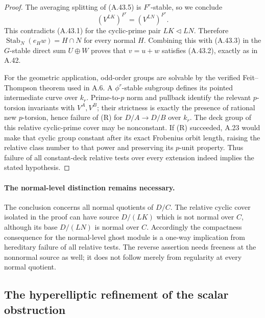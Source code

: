 \documentclass[11pt]{article}
\begin{document}
\begin{proof}
The averaging splitting of (A.43.5) is \(F^r\)-stable,
so we conclude
\[
                         (V^{LK})^{F^r}=(V^{LN})^{F^r}.
\]
This contradicts (A.43.1) for the cyclic-prime pair
\(LK\triangleleft LN\). Therefore
\(\operatorname{Stab}_N(e_Hw)=H\cap N\) for every normal
\(H\). Combining this with (A.43.3) in the
\(G\)-stable direct sum \(U\oplus W\) proves that
\(v=u+w\) satisfies (A.43.2), exactly as in A.42.

For the geometric application, odd-order groups are solvable
by the verified Feit--Thompson theorem used in A.6.
A \(\phi^r\)-stable
subgroup defines its pointed intermediate curve over
\(k_r\). Prime-to-\(p\) norm and pullback identify
the relevant \(p\)-torsion invariants with
\(V^A,V^B\); their strictness is exactly the presence
of rational new \(p\)-torsion, hence failure of (R)
for \(D/A\to D/B\) over \(k_r\). The deck group of
this relative cyclic-prime cover may be nonconstant.
If (R) succeeded, A.23 would make that cyclic group
constant after its exact Frobenius orbit length,
raising the relative class number to that power and
preserving its \(p\)-unit property. Thus failure of
all constant-deck relative tests over every extension
indeed implies the stated hypothesis.
\end{proof}

\paragraph{The normal-level distinction remains necessary.}
The conclusion concerns all normal quotients of \(D/C\).
The relative cyclic cover isolated in the proof can
have source \(D/(LK)\) which is not normal over \(C\),
although its base \(D/(LN)\) is normal over \(C\).
Accordingly the compactness consequence for the
normal-level ghost module is a one-way implication
from hereditary failure of all relative tests.
The reverse assertion needs freeness at the nonnormal
source as well; it does not follow merely from
regularity at every normal quotient.


\subsection{The hyperelliptic refinement of the scalar obstruction}
\end{document}
